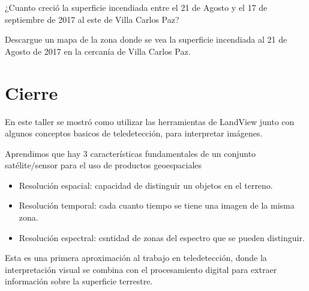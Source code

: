 \documentclass[a4paper,12pt]{book}
\begin{document}
\begin{que}
    ¿Cuanto creció la superficie incendiada entre el 21 de Agosto y el 17 de septiembre de 2017 al este de Villa Carlos Paz?
\end{que}

\begin{que}
    Descargue un mapa de la zona donde se vea la superficie incendiada al 21 de Agosto de 2017 en la cercanía de Villa Carlos Paz.
\end{que}

\chapter{Cierre}

En este taller se mostró como utilizar las herramientas de LandView junto con algunos conceptos basicos de teledetección, para interpretar imágenes.

Aprendimos que hay 3 características fundamentales de un conjunto satélite/sensor para el uso de productos geoespaciales

\begin{itemize}
    \item Resolución espacial: capacidad de distinguir un objetos en el terreno.
    \item Resolución temporal: cada cuanto tiempo se tiene una imagen de la misma zona.
    \item Resolución espectral: csntidad de zonas del espectro que se pueden distinguir.
\end{itemize}

Esta es una primera aproximación al trabajo en teledetección, donde la interpretación visual se combina con el procesamiento digital para extraer información sobre la superficie terrestre.
\end{document}
